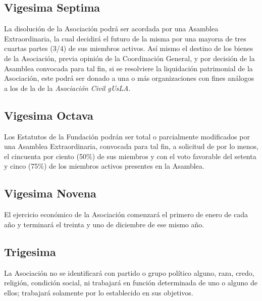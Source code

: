     \subsection{Vigesima Septima}
      La disoluci\'on de la Asociaci\'on podr\'a ser acordada por una Asamblea
      Extraordinaria, la cual  decidir\'a el futuro de la misma por una
      mayor\i{}a de tres cuartas partes (3/4) de sus miembros activos. As\'i{}
      mismo el destino de los bienes de la Asociaci\'on, previa opini\'on de la
      Coordinaci\'on General, y por decisi\'on de la Asamblea convocada para tal
      fin, si se resolviere la liquidaci\'on patrimonial de la Asociaci\'on,
      este podr\'a ser donado a una o m\'as organizaciones con fines an\'alogos
      a los de la de la \emph{Asociaci\'on Civil gUsLA}.
      
    \subsection{Vigesima Octava}
      Los Estatutos de la Fundaci\'on podr\'an ser total o parcialmente
      modificados por una Asamblea Extraordinaria, convocada para tal fin, a
      solicitud  de por lo menos, el cincuenta por ciento (50\%) de sus miembros
      y con el voto favorable del setenta y cinco (75\%)  de los miembros
      activos presentes en la Asamblea. 
      
    \subsection{Vigesima Novena}
      El ejercicio econ\'omico de la Asociaci\'on comenzar\'a el primero de
      enero de cada a\~no y terminar\'a el treinta y uno de diciembre de ese
      mismo a\~no. 

    \subsection{Trigesima}
      La Asociaci\'on no se identificar\'a con partido o grupo pol\'itico
      alguno, raza, credo, religi\'on, condici\'on social, ni trabajar\'a en
      funci\'on determinada de uno o alguno de ellos; trabajar\'a solamente por
      lo establecido en sus objetivos. 
